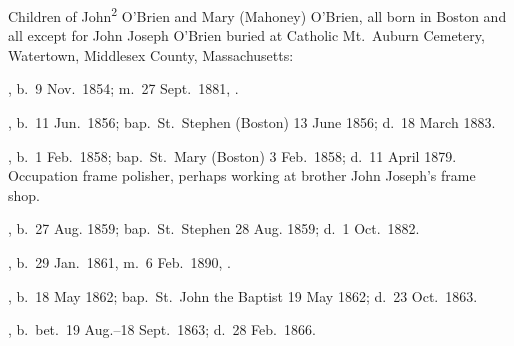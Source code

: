 \begin{KidsIntro}
	Children of John\textsuperscript{2} O'Brien and Mary (Mahoney) O'Brien, all born in Boston and all except for John Joseph O'Brien buried at Catholic Mt.\ Auburn Cemetery, Watertown, Middlesex County, Massachusetts:\cite{BillMcEvoy:3}
\end{KidsIntro}

\begin{Kids}
	, b.\ 9 Nov.\ 1854; m.\ 27 Sept.\ 1881, .
	
	, b.\ 11 Jun.\ 1856;\cite{Mary3OBrienBirth} bap.\ St.\ Stephen (Boston) 13 June 1856;\cite{Mary3OBrienBaptism} d.\ 18 March 1883.\cite{Mary3OBrienDeath}
	
	, b.\ 1 Feb.\ 1858;\cite{James3OBrienBirth} bap.\ St.\ Mary (Boston) 3 Feb.\ 1858;\cite{James3OBrienBaptism} d.\ 11 April 1879. Occupation frame polisher,\cite{James3OBrienDeath} perhaps working at brother John Joseph's frame shop.
	
	, b.\ 27 Aug. 1859;\cite{Ellen3OBrien2Baptism:1} bap.\ St.\ Stephen 28 Aug. 1859;\cite{Ellen3OBrien2Baptism:2} d.\ 1 Oct.\ 1882.\cite{Ellen3OBrien2Death}
	
	, b.\ 29 Jan.\ 1861, m.\ 6 Feb.\ 1890, .
	
	, b.\ 18 May 1862;\cite{Margaret3OBrienBaptism:1} bap.\ St.\ John the Baptist 19 May 1862;\cite{Margaret3OBrienBaptism:2} d.\ 23 Oct.\ 1863.\cite{Margaret3OBrienDeath}
	
	, b.\ bet.\ 19 Aug.--18 Sept.\ 1863;\cite{Anna3OBrienDeath:1} d.\ 28 Feb.\ 1866.\cite{Anna3OBrienDeath:2}
	
\end{Kids}